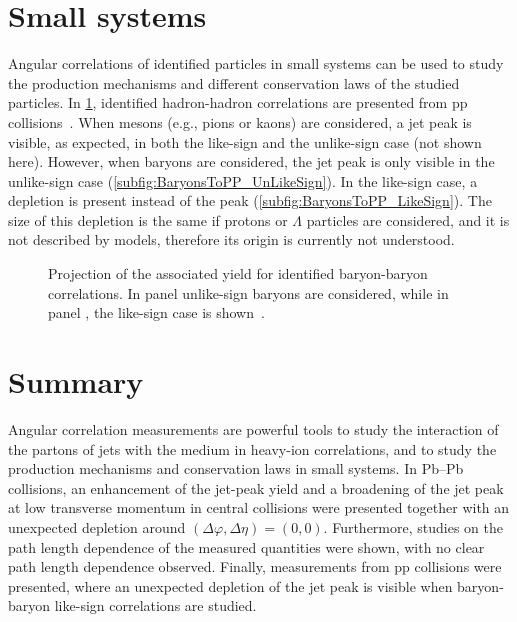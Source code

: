 \documentclass{PoS}
\begin{document}
\section{Small systems}
Angular correlations of identified particles in small systems can be used to study the production mechanisms and different conservation laws of the studied particles. In \cref{fig:pp_identified}, identified hadron-hadron correlations are presented from pp collisions~\cite{Adam:2016iwf}. When mesons (e.g., pions or kaons) are considered, a jet peak is visible, as expected, in both the like-sign and the unlike-sign case (not shown here). However, when baryons are considered, the jet peak is only visible in the unlike-sign case (\cref{subfig:BaryonsToPP_UnLikeSign}). In the like-sign case, a depletion is present instead of the peak (\cref{subfig:BaryonsToPP_LikeSign}). The size of this depletion is the same if protons or $\Lambda$ particles are considered, and it is not described by models, therefore its origin is currently not understood.

\begin{figure}[!htbp]
  \caption{Projection of the associated yield for identified baryon-baryon correlations. In panel \protect{} unlike-sign baryons are considered, while in panel \protect{}, the like-sign case is shown~\cite{Adam:2016iwf}.}
  \label{fig:pp_identified}
\end{figure}

\section{Summary}
Angular correlation measurements are powerful tools to study the interaction of the partons of jets with the medium in heavy-ion correlations, and to study the production mechanisms and conservation laws in small systems. In Pb--Pb collisions, an enhancement of the jet-peak yield and a broadening of the jet peak at low transverse momentum in central collisions were presented together with an unexpected depletion around $(\Delta\varphi,\Delta\eta) = (0,0)$. Furthermore, studies on the path length dependence of the measured quantities were shown, with no clear path length dependence observed. Finally, measurements from pp collisions were presented, where an unexpected depletion of the jet peak is visible when baryon-baryon like-sign correlations are studied.
\end{document}
